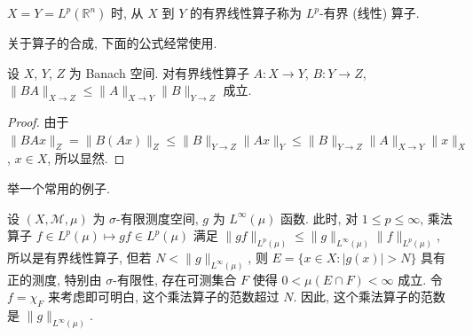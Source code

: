 $X = Y = L^{p}(\mathbb{R}^{n})$ 时, 从 $X$ 到 $Y$ 的有界线性算子称为 $L^{p}$-有界 (线性) 算子.

关于算子的合成, 下面的公式经常使用.

\begin{theorem}\label{thm:2.24}
设 $X$, $Y$, $Z$ 为 Banach 空间. 对有界线性算子 $A: X \to Y$, $B: Y \to Z$, $\|BA\|_{X \to Z} \leq \|A\|_{X \to Y}\|B\|_{Y \to Z}$ 成立.
\end{theorem}

\begin{proof}
由于 $\|BAx\|_{Z} = \|B(Ax)\|_{Z} \leq \|B\|_{Y \to Z}\|Ax\|_{Y} \leq \|B\|_{Y \to Z}\|A\|_{X \to Y}\|x\|_{X}$, $x \in X$, 所以显然.
\end{proof}

举一个常用的例子.

\begin{example}\label{exa:2.4}
设 $(X, \mathcal{M}, \mu)$ 为 $\sigma$-有限测度空间, $g$ 为 $L^{\infty}(\mu)$ 函数. 此时, 对 $1 \leq p \leq \infty$, 乘法算子 $f \in L^{p}(\mu) \mapsto gf \in L^{p}(\mu)$ 满足 $\|gf\|_{L^{p}(\mu)} \leq \|g\|_{L^{\infty}(\mu)}\|f\|_{L^{p}(\mu)}$, 所以是有界线性算子, 但若 $N < \|g\|_{L^{\infty}(\mu)}$, 则 $E = \{x \in X : |g(x)| > N\}$ 具有正的测度, 特别由 $\sigma$-有限性, 存在可测集合 $F$ 使得 $0 < \mu(E \cap F) < \infty$ 成立. 令 $f = \chi_{F}$ 来考虑即可明白, 这个乘法算子的范数超过 $N$. 因此, 这个乘法算子的范数是 $\|g\|_{L^{\infty}(\mu)}$.
\end{example}
